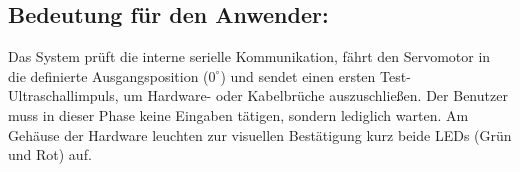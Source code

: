 \subsection{Bedeutung für den Anwender:} 
Das System prüft die interne serielle Kommunikation, fährt den Servomotor in die definierte Ausgangsposition ($0^\circ$) und sendet einen ersten Test-Ultraschallimpuls, um Hardware- oder Kabelbrüche auszuschließen. Der Benutzer muss in dieser Phase keine Eingaben tätigen, sondern lediglich warten. Am Gehäuse der Hardware leuchten zur visuellen Bestätigung kurz beide LEDs (Grün und Rot) auf.
